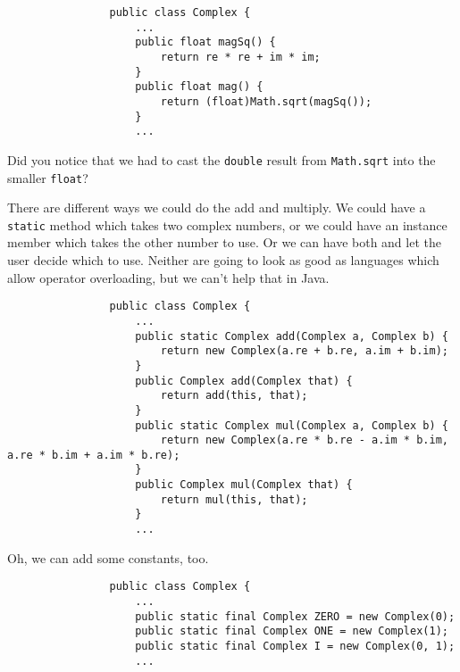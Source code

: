 \documentclass{article}
\begin{document}
            \begin{verbatim}
                public class Complex {
                    ...
                    public float magSq() {
                        return re * re + im * im; 
                    }
                    public float mag() {
                        return (float)Math.sqrt(magSq());
                    }
                    ...
            \end{verbatim}
            
            Did you notice that we had to cast the \texttt{double} result from \texttt{Math.sqrt} into the smaller \texttt{float}?
            
            There are different ways we could do the add and multiply. We could have a \texttt{static} method which takes two complex
            numbers, or we could have an instance member which takes the other number to use. Or we can have both and let the user decide
            which to use. Neither are going to look as good as languages which allow operator overloading, but we can't help that in Java.
            
            \begin{verbatim}
                public class Complex {
                    ...
                    public static Complex add(Complex a, Complex b) {
                        return new Complex(a.re + b.re, a.im + b.im);
                    }
                    public Complex add(Complex that) {
                        return add(this, that);
                    }
                    public static Complex mul(Complex a, Complex b) {
                        return new Complex(a.re * b.re - a.im * b.im, a.re * b.im + a.im * b.re);
                    }
                    public Complex mul(Complex that) {
                        return mul(this, that);
                    }
                    ...
            \end{verbatim}
            
            Oh, we can add some constants, too.
            
            \begin{verbatim}
                public class Complex {
                    ...
                    public static final Complex ZERO = new Complex(0);
                    public static final Complex ONE = new Complex(1);
                    public static final Complex I = new Complex(0, 1);
                    ...
            \end{verbatim}
                    
\end{document}
